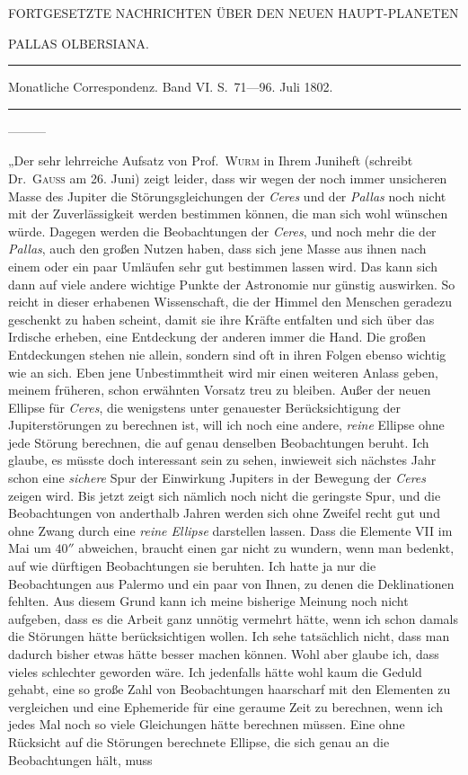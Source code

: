%
\bigskip{}
\begin{center}
{\small FORTGESETZTE NACHRICHTEN ÜBER DEN NEUEN HAUPT-PLANETEN\par}
PALLAS OLBERSIANA.\par
\medskip\hrule\medskip
Monatliche Correspondenz. Band VI. S.\ 71—96. Juli 1802.\par
\medskip\hrule
\end{center}\medskip
—\quad —\quad —

„Der sehr lehrreiche Aufsatz von Prof.\ \textsc{Wurm} in Ihrem Juniheft (schreibt Dr.\ \textsc{Gauß} am 26. Juni) zeigt leider, dass wir wegen der noch immer unsicheren Masse des Jupiter die Störungsgleichungen der \textit{Ceres} und der \textit{Pallas} noch nicht mit der Zuverlässigkeit werden bestimmen können, die man sich wohl wünschen würde. Dagegen werden die Beobachtungen der \textit{Ceres}, und noch mehr die der \textit{Pallas}, auch den großen Nutzen haben, dass sich jene Masse aus ihnen nach einem oder ein paar Umläufen sehr gut bestimmen lassen wird. Das kann sich dann auf viele andere wichtige Punkte der Astronomie nur günstig auswirken. So reicht in dieser erhabenen Wissenschaft, die der Himmel den Menschen geradezu geschenkt zu haben scheint, damit sie ihre Kräfte entfalten und sich über das Irdische erheben, eine Entdeckung der anderen immer die Hand. Die großen Entdeckungen stehen nie allein, sondern sind oft in ihren Folgen ebenso wichtig wie an sich. Eben jene Unbestimmtheit wird mir einen weiteren Anlass geben, meinem früheren, schon erwähnten Vorsatz treu zu bleiben. Außer der neuen Ellipse für \textit{Ceres}, die wenigstens unter genauester Berücksichtigung der Jupiterstörungen zu berechnen ist, will ich noch eine andere, \textit{reine} Ellipse ohne jede Störung berechnen, die auf genau denselben Beobachtungen beruht. Ich glaube, es müsste doch interessant sein zu sehen, inwieweit sich nächstes Jahr schon eine \textit{sichere} Spur der Einwirkung Jupiters in der Bewegung der \textit{Ceres} zeigen wird. Bis jetzt zeigt sich nämlich noch nicht die geringste Spur, und die Beobachtungen von anderthalb Jahren werden sich ohne Zweifel recht gut und ohne Zwang durch eine \textit{reine Ellipse} darstellen lassen. Dass die Elemente VII im Mai um $40''$ abweichen, braucht einen gar nicht zu wundern, wenn man bedenkt, auf wie dürftigen Beobachtungen sie beruhten. Ich hatte ja nur die Beobachtungen aus Palermo und ein paar von Ihnen, zu denen die Deklinationen fehlten. Aus diesem Grund kann ich meine bisherige Meinung noch nicht aufgeben, dass es die Arbeit ganz unnötig vermehrt hätte, wenn ich schon damals die Störungen hätte berücksichtigen wollen. Ich sehe tatsächlich nicht, dass man dadurch bisher etwas hätte besser machen können. Wohl aber glaube ich, dass vieles schlechter geworden wäre. Ich jedenfalls hätte wohl kaum die Geduld gehabt, eine so große Zahl von Beobachtungen haarscharf mit den Elementen zu vergleichen und eine Ephemeride für eine geraume Zeit zu berechnen, wenn ich jedes Mal noch so viele Gleichungen hätte berechnen müssen. Eine ohne Rücksicht auf die Störungen berechnete Ellipse, die sich genau an die Beobachtungen hält, muss 